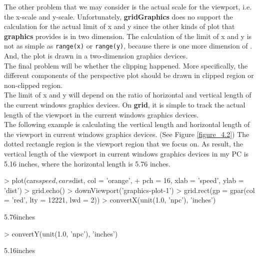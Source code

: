 \documentclass{report}
\begin{document}
The other problem that we may consider is the actual scale for the viewport, i.e. the x-scale and y-scale. Unfortunately, \textbf{gridGraphics} does no support the calculation for the actual limit of x and y since the other kinds of plot that \textbf{graphics} provides is in two dimension. The calculation of the limit of x and y is not as simple as \texttt{range(x)} or \texttt{range(y)}, because there is one more dimension of . And, the plot is drawn in a two-dimension graphics devices.\\

The final problem will be whether the clipping happened. More specifically, the different components of the perspective plot should be drawn in clipped region or non-clipped region. \\

The limit of x and y will depend on the ratio of horizontal and vertical length of the current windows graphics devices. On \textbf{grid}, it is simple to track the actual length of the viewport in the current windows graphics devices. \\

The following example is calculating the vertical length and horizontal length of the viewport in current windows graphics devices. (See Figure \ref{figure_4.2}) The dotted rectangle region is the viewport region that we focus on. As result, the vertical length of the viewport in current windows graphics devices in my PC is 5.16 inches, where the horizontal length is 5.76 inches. \\
\begin{Schunk}
\begin{Sinput}
> plot(cars$speed, cars$dist, col = 'orange', 
+       pch = 16, xlab = 'speed', ylab = 'dist')
> grid.echo()
> downViewport('graphics-plot-1')
> grid.rect(gp = gpar(col = 'red', lty = 12221, lwd = 2))
> convertX(unit(1.0, 'npc'), 'inches')
\end{Sinput}
\begin{Soutput}
[1] 5.76inches
\end{Soutput}
\begin{Sinput}
> convertY(unit(1.0, 'npc'), 'inches')
\end{Sinput}
\begin{Soutput}
[1] 5.16inches
\end{Soutput}
\end{Schunk}
\end{document}
